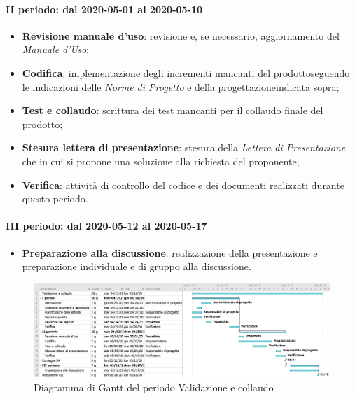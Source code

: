 \paragraph*{II periodo: dal 2020-05-01 al 2020-05-10}
\begin{itemize}
	\item \textbf{Revisione manuale d'uso}: revisione e, se necessario, aggiornamento del \textit{Manuale d'Uso};
	\item \textbf{Codifica}: implementazione degli incrementi mancanti del prodotto\glosp seguendo le indicazioni delle \textit{Norme di Progetto} e della progettazione\glosp indicata sopra;
	\item \textbf{Test e collaudo}: scrittura dei test mancanti per il collaudo finale del prodotto\glo;
	\item \textbf{Stesura lettera di presentazione}: stesura della \textit{Lettera di Presentazione} che in cui si propone una soluzione alla richiesta del proponente;
	\item \textbf{Verifica}: attività di controllo del codice e dei documenti realizzati durante questo periodo.
\end{itemize}

\paragraph*{III periodo: dal 2020-05-12 al 2020-05-17}
\begin{itemize}
	\item \textbf{Preparazione alla discussione}: realizzazione della presentazione e preparazione individuale e di gruppo alla discussione.
\end{itemize}

\begin{landscape}
	\begin{figure}
		\includegraphics[width=\linewidth]{./gantt/Validazione e collaudo.png}
		\caption{Diagramma di Gantt del periodo Validazione e collaudo}
	\end{figure}
\end{landscape}
\pagebreak
